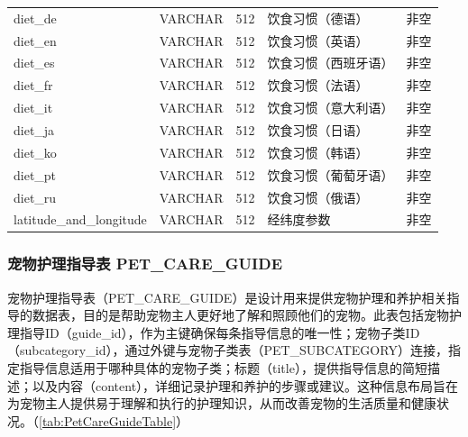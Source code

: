 \begin{longtable}[c]{@{}llrll@{}}
    diet\_de                 & VARCHAR       & 512         & 饮食习惯（德语）     & 非空                                   \\
    diet\_en                 & VARCHAR       & 512         & 饮食习惯（英语）     & 非空                                   \\
    diet\_es                 & VARCHAR       & 512         & 饮食习惯（西班牙语）   & 非空                                   \\
    diet\_fr                 & VARCHAR       & 512         & 饮食习惯（法语）     & 非空                                   \\
    diet\_it                 & VARCHAR       & 512         & 饮食习惯（意大利语）   & 非空                                   \\
    diet\_ja                 & VARCHAR       & 512         & 饮食习惯（日语）     & 非空                                   \\
    diet\_ko                 & VARCHAR       & 512         & 饮食习惯（韩语）     & 非空                                   \\
    diet\_pt                 & VARCHAR       & 512         & 饮食习惯（葡萄牙语）   & 非空                                   \\
    diet\_ru                 & VARCHAR       & 512         & 饮食习惯（俄语）     & 非空                                   \\
    latitude\_and\_longitude & VARCHAR       & 512         & 经纬度参数        & 非空                                   \\ \bottomrule
\end{longtable}

\subsubsection{宠物护理指导表 PET\_CARE\_GUIDE}

宠物护理指导表（PET\_CARE\_GUIDE）是设计用来提供宠物护理和养护相关指导的数据表，目的是帮助宠物主人更好地了解和照顾他们的宠物。此表包括宠物护理指导ID（guide\_id），作为主键确保每条指导信息的唯一性；宠物子类ID（subcategory\_id），通过外键与宠物子类表（PET\_SUBCATEGORY）连接，指定指导信息适用于哪种具体的宠物子类；标题（title），提供指导信息的简短描述；以及内容（content），详细记录护理和养护的步骤或建议。这种信息布局旨在为宠物主人提供易于理解和执行的护理知识，从而改善宠物的生活质量和健康状况。（\cref{tab:PetCareGuideTable}）

